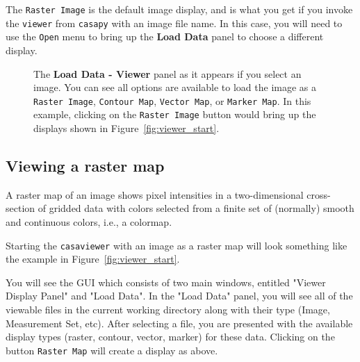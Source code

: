 The {\tt Raster Image} is the default image display, and is what you
get if you invoke the {\tt viewer} from {\tt casapy} with an image
file name.  In this case, you will need to use the {\tt Open} menu to
bring up the {\bf Load Data} panel to choose a different display.

\begin{figure}[h!]
\begin{center}
\caption{\label{fig:viewer_load_image} The {\bf Load Data - Viewer} panel
as it appears if you select an image.  You can see all options
are available to load the image as a {\tt Raster Image}, 
{\tt Contour Map}, {\tt Vector Map}, or {\tt Marker Map}.
In this example, clicking on the {\tt Raster Image} button would 
bring up the displays shown in Figure~\ref{fig:viewer_start}.}
\hrulefill
\end{center}
\end{figure}


\subsection{Viewing a raster map}
\label{section:display.image.raster}

A raster map of an image shows pixel intensities in a two-dimensional
cross-section of gridded data with colors selected from a finite set
of (normally) smooth and continuous colors, i.e., a colormap.


Starting the {\tt casaviewer} with an image as a raster map will look
something like the example in Figure~\ref{fig:viewer_start}. 
 
You will see the GUI which consists of two main windows, entitled
"Viewer Display Panel" and "Load Data". In the "Load Data" panel, you
will see all of the viewable files in the current working directory along
with their type (Image, Measurement Set, etc).  After selecting a file, you
are presented with the available display types (raster, contour,
vector, marker) for these data. Clicking
on the button {\tt Raster Map} will create a display as above. 

